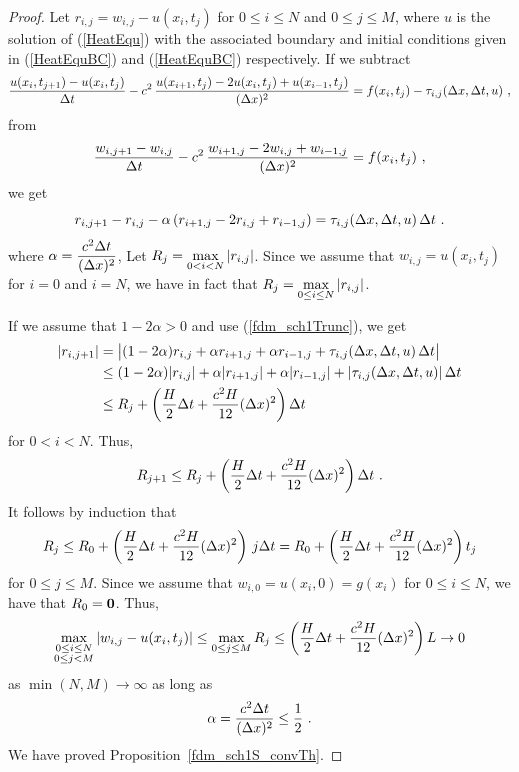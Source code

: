 \begin{proof}
Let $r_{i,j} = w_{i,j} - u(x_i,t_j)$ for $0\leq i \leq N$ and
$0 \leq j \leq M$, where $u$ is the solution of (\ref{HeatEqu})
with the associated boundary and initial conditions given in
(\ref{HeatEquBC}) and (\ref{HeatEquBC}) respectively.
If we subtract
\[
\frac{u(x_i,t_{j+1}) - u(x_i,t_j)}{\Delta{t}}
- c^2\, \frac{u(x_{i+1},t_j) - 2u(x_i,t_j) + u(x_{i-1},t_j)}{(\Delta{x})^2} = 
f(x_i,t_j) - \tau_{i,j}(\Delta{x},\Delta{t},u) \ ,
\]
from
\[
\frac{w_{i,j+1} - w_{i,j}}{\Delta{t}}  - c^2\, \frac{w_{i+1,j} - 2w_{i,j} +
w_{i-1,j}}{(\Delta{x})^2} = f(x_i,t_j) \ ,
\]
we get
\[
r_{i,j+1} - r_{i,j} - \alpha \left( r_{i+1,j} - 2 r_{i,j}  + r_{i-1,j} \right)
= \tau_{i,j}(\Delta{x},\Delta{t},u) \, \Delta{t} \ .
\]
where $\displaystyle \alpha = \frac{c^2\Delta{t}}{(\Delta{x})^2}$,  Let
$\displaystyle R_j = \max_{0 < i < N}|r_{i,j}|$.  Since we assume that
$w_{i,j} = u(x_i,t_j)$ for $i=0$ and $i=N$, we have in fact that
$\displaystyle R_j = \max_{0 \leq i \leq N}|r_{i,j}|$.

If we assume that $1 - 2\alpha >0$ and use (\ref{fdm_sch1Trunc}), we
get
\begin{align*}
|r_{i,j+1}| &= \big| (1-2\alpha) r_{i,j} + \alpha r_{i+1,j} + \alpha
  r_{i-1,j} + \tau_{i,j}(\Delta{x},\Delta{t},u) \, \Delta{t} \big| \\
&\leq (1-2\alpha) |r_{i,j}| + \alpha |r_{i+1,j}| + \alpha
  |r_{i-1,j}| + |\tau_{i,j}(\Delta{x},\Delta{t},u)| \, \Delta{t} \\
&\leq R_j + \left(\frac{H}{2} \Delta{t} + \frac{c^2 H}{12} (\Delta{x})^2 \right)
\Delta{t}
\end{align*}
for $0 < i < N$.  Thus,
\[
R_{j+1} \leq R_j + \left(\frac{H}{2} \Delta{t} + \frac{c^2 H}{12}
(\Delta{x})^2 \right) \Delta{t} \ .
\]
It follows by induction that
\[
R_j \leq R_0 + \left(\frac{H}{2} \Delta{t} + \frac{c^2 H}{12}
  (\Delta{x})^2 \right) \, j \Delta{t}
= R_0 + \left(\frac{H}{2} \Delta{t} + \frac{c^2 H}{12}
  (\Delta{x})^2 \right) t_j
\]
for $0\leq j \leq M$.
Since we assume that $w_{i,0} = u(x_i,0) = g(x_i)$ for $0\leq i \leq N$,
we have that $R_0 = \bm{0}$.  Thus,
\[
\max_{\substack{0\leq i\leq N\\0 \leq j <M}} |w_{i,j} - u(x_i,t_j) |
\leq \max_{0 \leq j \leq M} R_j
\leq \left(\frac{H}{2} \Delta{t} + \frac{c^2 H}{12}
(\Delta{x})^2 \right) L \to 0
\]
as $\min(N,M) \to \infty$ as long as
\begin{equation} \label{fdm_sch1Cond}
\alpha = \frac{c^2\Delta{t}}{(\Delta{x})^2} \leq \frac{1}{2} \ .
\end{equation}
We have proved Proposition~\ref{fdm_sch1S_convTh}.
\end{proof}

